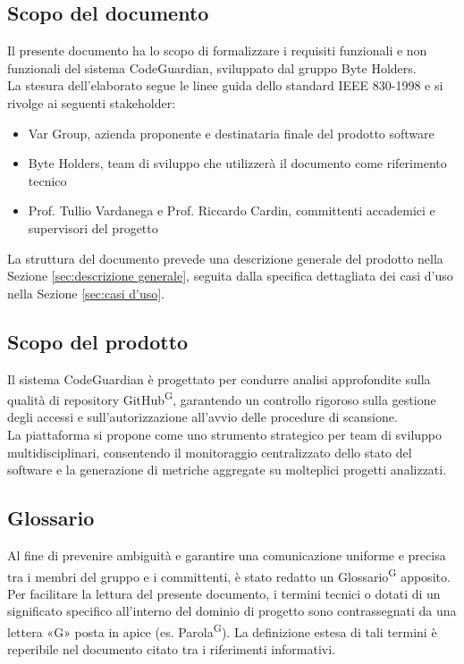 \documentclass[a4paper, 11pt]{article}
\begin{document}
\subsection{Scopo del documento}
Il presente documento ha lo scopo di formalizzare i requisiti funzionali e non funzionali del sistema CodeGuardian, sviluppato dal gruppo Byte Holders. \\
La stesura dell'elaborato segue le linee guida dello standard IEEE 830-1998 e si rivolge ai seguenti stakeholder:
\begin{itemize}
	\item Var Group, azienda proponente e destinataria finale del prodotto software
	\item Byte Holders, team di sviluppo che utilizzerà il documento come riferimento tecnico
	\item Prof. Tullio Vardanega e Prof. Riccardo Cardin, committenti accademici e supervisori del progetto
\end{itemize}
La struttura del documento prevede una descrizione generale del prodotto nella Sezione \ref{sec:descrizione generale}, seguita dalla specifica dettagliata dei casi d'uso nella Sezione \ref{sec:casi d'uso}.

\subsection{Scopo del prodotto}
Il sistema CodeGuardian è progettato per condurre analisi approfondite sulla qualità di repository GitHub\textsuperscript{G}, garantendo un controllo rigoroso sulla gestione degli accessi e sull'autorizzazione all'avvio delle procedure di scansione. 
\\
La piattaforma si propone come uno strumento strategico per team di sviluppo multidisciplinari, consentendo il monitoraggio centralizzato dello stato del software e la generazione di metriche aggregate su molteplici progetti analizzati.

\subsection{Glossario}
Al fine di prevenire ambiguità e garantire una comunicazione uniforme e precisa tra i membri del gruppo e i committenti, è stato redatto un Glossario\textsuperscript{G} apposito.
Per facilitare la lettura del presente documento, i termini tecnici o dotati di un significato specifico all'interno del dominio di progetto sono contrassegnati da una lettera «G» posta in apice (es. Parola\textsuperscript{G}).
La definizione estesa di tali termini è reperibile nel documento citato tra i riferimenti informativi.
\end{document}
